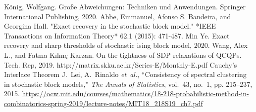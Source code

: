 \documentclass{article}
\begin{document}
\begin{thebibliography}{9}
	 König, Wolfgang. Große Abweichungen: Techniken und Anwendungen. Springer International Publishing, 2020.
	 Abbe, Emmanuel, Afonso S. Bandeira, and Georgina Hall. "Exact recovery in the stochastic block model." *IEEE Transactions on Information Theory* 62.1 (2015): 471-487.
	 	Min Ye.
	\newblock Exact recovery and sharp thresholds of stochastic ising block model,
	2020.
	 Wang, Alex L., and Fatma Kılınç-Karzan. On the tightness of SDP relaxations of QCQPs. Tech. Rep, 2019.
	 http://matrix.skku.ac.kr/Series-E/Monthly-E.pdf Cauchy’s Interlace Theorem
	J.~Lei, A.~Rinaldo \emph{et~al.}, ``Consistency of spectral clustering in
	stochastic block models,'' \emph{The Annals of Statistics}, vol.~43, no.~1,
	pp. 215--237, 2015.
	 \url{https://ocw.mit.edu/courses/mathematics/18-218-probabilistic-method-in-combinatorics-spring-2019/lecture-notes/MIT18_218S19_ch7.pdf}
\end{thebibliography}
\end{document}
